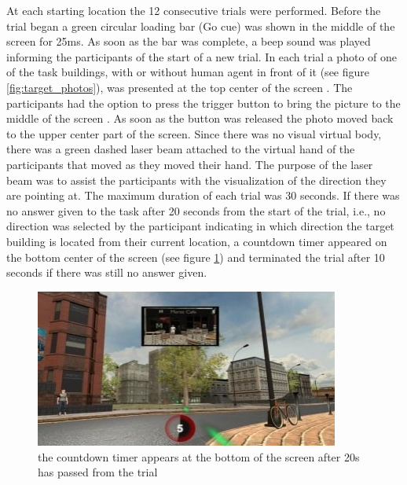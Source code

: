 At each starting location the 12 consecutive trials were performed. Before the trial began a green circular loading bar {\emphasize (Go cue)} was shown in the middle of the screen for 25ms. As soon as the bar was complete, a beep sound was played informing the participants of the start of a new trial. In each trial a photo of one of the task buildings, with or without human agent in front of it (see figure \ref{fig:target_photos}), was presented at the top center of the screen . The participants had the option to press the trigger button to bring the picture to the middle of the screen . As soon as the button was released the photo moved back to the upper center part of the screen. Since there was no visual virtual body, there was a green dashed laser beam  attached to the virtual hand of the participants that moved as they moved their hand. The purpose of the laser beam was to assist the participants with the visualization of the direction they are pointing at. The maximum duration of each trial was 30 seconds. If there was no answer given to the task after 20 seconds from the start of the trial, i.e., no direction was selected by the participant indicating in which direction the target building is located from their current location, a countdown timer appeared on the bottom center of the screen (see figure \ref{fig:timer}) and terminated the trial after 10 seconds if there was still no answer given. \\

\begin{figure}[h]
	\centering
	\includegraphics[width=100mm]{figures/timer.jpg}
	\caption[The countdown timer]{the countdown timer appears at the bottom of the screen after 20s has passed from the trial}
	\label{fig:timer}
\end{figure}

